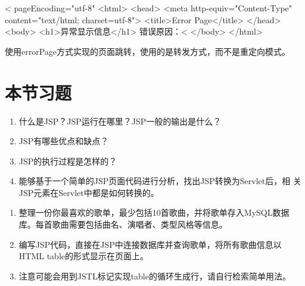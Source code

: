 
\begin{jspCode}
  <%
    pageEncoding="utf-8"%
  <html>
    <head>
      <meta http-equiv="Content-Type" content="text/html; charset=utf-8">
      <title>Error Page</title>
    </head>
    <body>
      <h1>异常显示信息</h1>
      错误原因：<%
    </body>
  </html>  
\end{jspCode}

{\kai\Red 使用errorPage方式实现的页面跳转，使用的是转发方式，而不是重定向模式。}




\section{本节习题}


\begin{enumerate}
\item 什么是JSP？JSP运行在哪里？JSP一般的输出是什么？
\item JSP有哪些优点和缺点？
\item JSP的执行过程是怎样的？
\item 能够基于一个简单的JSP页面代码进行分析，找出JSP转换为Servlet后，相
  关JSP元素在Servlet中都是如何转换的。
\end{enumerate}


\begin{enumerate}
\item 整理一份你最喜欢的歌单，最少包括10首歌曲，并将歌单存入MySQL数据库。每首歌曲需要包括曲名、演唱者、类型风格等信息。
\item 编写JSP代码，直接在JSP中连接数据库并查询歌单，将所有歌曲信息以HTML table的形式显示在页面上。
\item 注意可能会用到JSTL标记实现table的循环生成行，请自行检索简单用法。
\end{enumerate}
